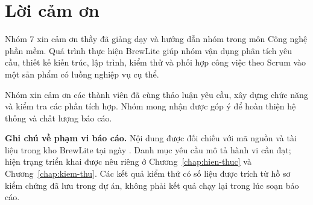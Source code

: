 \chapter*{Lời cảm ơn}
Nhóm 7 xin cảm ơn thầy \GiangVien{} đã giảng dạy và hướng dẫn nhóm
trong môn Công nghệ phần mềm. Quá trình thực hiện BrewLite giúp nhóm
vận dụng phân tích yêu cầu, thiết kế kiến trúc, lập trình, kiểm thử và
phối hợp công việc theo Scrum vào một sản phẩm có luồng nghiệp vụ cụ thể.

Nhóm xin cảm ơn các thành viên đã cùng thảo luận yêu cầu, xây dựng
chức năng và kiểm tra các phần tích hợp. Nhóm mong nhận được góp ý
để hoàn thiện hệ thống và chất lượng báo cáo.

\vspace{0.7cm}
\noindent\textbf{Ghi chú về phạm vi báo cáo.}
Nội dung được đối chiếu với mã nguồn và tài liệu trong kho BrewLite
tại ngày \NgayDoiChieu. Danh mục yêu cầu mô tả hành vi cần đạt;
hiện trạng triển khai được nêu riêng ở Chương~\ref{chap:hien-thuc}
và Chương~\ref{chap:kiem-thu}. Các kết quả kiểm thử có số liệu được
trích từ hồ sơ kiểm chứng đã lưu trong dự án, không phải kết quả chạy
lại trong lúc soạn báo cáo.
\clearpage
